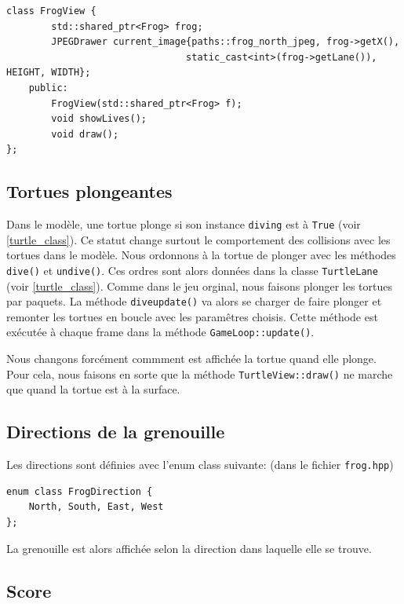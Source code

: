 \documentclass[a4paper, 12pt]{article}
\begin{document}
\begin{lstlisting}
class FrogView {    
        std::shared_ptr<Frog> frog;
        JPEGDrawer current_image{paths::frog_north_jpeg, frog->getX(),
                                static_cast<int>(frog->getLane()), HEIGHT, WIDTH};
    public:
        FrogView(std::shared_ptr<Frog> f);
        void showLives();
        void draw();
};
\end{lstlisting}

\subsection{Tortues plongeantes} \label{diving_turtles}

Dans le modèle, 
une tortue plonge si son instance \texttt{diving} est à \texttt{True} (voir \ref{turtle_class}). 
Ce statut change surtout le comportement des collisions avec les tortues dans le modèle. 
Nous ordonnons à la tortue de plonger avec les méthodes \texttt{dive()} et \texttt{undive()}. 
Ces ordres sont alors données dans la classe \texttt{TurtleLane} (voir \ref{turtle_class}). 
Comme dans le jeu orginal, nous faisons plonger les tortues par paquets. 
La méthode \texttt{dive\textunderscore update()} va alors se charger de faire plonger et 
remonter les tortues en boucle avec les paramêtres choisis. 
Cette méthode est exécutée à chaque frame dans la méthode \texttt{GameLoop::update()}.

Nous changons forcément commment est affichée la tortue quand elle plonge. Pour cela, nous faisons en sorte que la méthode \texttt{TurtleView::draw()} ne marche que quand la tortue est à la surface.

\subsection{Directions de la grenouille} \label{frogview}

Les directions sont définies avec l'enum class suivante: (dans le fichier \texttt{frog.hpp})

\begin{lstlisting}
enum class FrogDirection {
    North, South, East, West
};
\end{lstlisting}

La grenouille est alors affichée selon la direction dans laquelle elle se trouve.

\subsection{Score}
\end{document}
